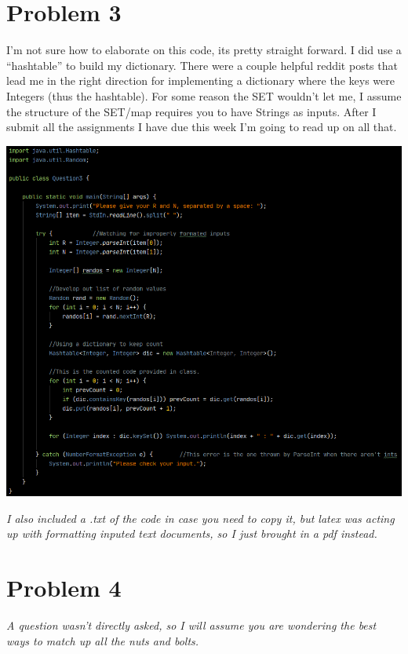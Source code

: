 \documentclass[11pt]{article}
\begin{document}
\newpage

\section*{Problem 3}
I'm not sure how to elaborate on this code, its pretty straight forward. I did use a ``hashtable'' to build my dictionary. There were a couple helpful reddit posts that lead me in the right direction for implementing a dictionary where the keys were Integers (thus the hashtable). For some reason the SET wouldn't let me, I assume the structure of the SET/map requires you to  have Strings as inputs. After I submit all the assignments I have due this week I'm going to read up on all that.\\
\begin{center}
\includegraphics[width = 400pt]{Homework_2/Question3.pdf}
\end{center}
\textit{I also included a .txt of the code in case you need to copy it, but latex was acting up with formatting inputed text documents, so I just brought in a pdf instead.}

\newpage

\section*{Problem 4}
\textit{A question wasn't directly asked, so I will assume you are wondering the best ways to match up all the nuts and bolts.}\\
\end{document}
